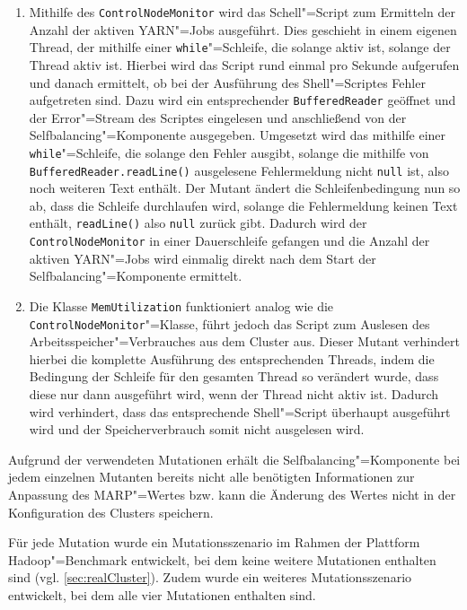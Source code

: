 \begin{enumerate}
    \item
    Mithilfe des \texttt{ControlNodeMonitor} wird das Schell"=Script zum Ermitteln der Anzahl der aktiven \gls{YARN}"=Jobs ausgeführt.
    Dies geschieht in einem eigenen Thread, der mithilfe einer \texttt{while}"=Schleife, die solange aktiv ist, solange der Thread aktiv ist.
    Hierbei wird das Script rund einmal pro Sekunde aufgerufen und danach ermittelt, ob bei der Ausführung des Shell"=Scriptes Fehler aufgetreten sind.
    Dazu wird ein entsprechender \texttt{BufferedReader} geöffnet und der Error"=Stream des Scriptes eingelesen und anschließend von der Selfbalancing"=Komponente ausgegeben.
    Umgesetzt wird das mithilfe einer \texttt{while}"=Schleife, die solange den Fehler ausgibt, solange die mithilfe von \texttt{BufferedReader.readLine()} ausgelesene Fehlermeldung nicht \texttt{null} ist, also noch weiteren Text enthält.
    Der Mutant ändert die Schleifenbedingung nun so ab, dass die Schleife durchlaufen wird, solange die Fehlermeldung keinen Text enthält, \texttt{readLine()} also \texttt{null} zurück gibt.
    Dadurch wird der \texttt{ControlNodeMonitor} in einer Dauerschleife gefangen und die Anzahl der aktiven \gls{YARN}"=Jobs wird einmalig direkt nach dem Start der Selfbalancing"=Komponente ermittelt.
            
    \item
    Die Klasse \texttt{MemUtilization} funktioniert analog wie die \texttt{ControlNodeMonitor}"=Klasse, führt jedoch das Script zum Auslesen des Arbeitsspeicher"=Verbrauches aus dem Cluster aus.
    Dieser Mutant verhindert hierbei die komplette Ausführung des entsprechenden Threads, indem die Bedingung der Schleife für den gesamten Thread so verändert wurde, dass diese nur dann ausgeführt wird, wenn der Thread nicht aktiv ist.
    Dadurch wird verhindert, dass das entsprechende Shell"=Script überhaupt ausgeführt wird und der Speicherverbrauch somit nicht ausgelesen wird.
\end{enumerate}

Aufgrund der verwendeten Mutationen erhält die Selfbalancing"=Komponente bei jedem einzelnen Mutanten bereits nicht alle benötigten Informationen zur Anpassung des \gls{MARP}"=Wertes bzw. kann die Änderung des Wertes nicht in der Konfiguration des Clusters speichern.

Für jede Mutation wurde ein Mutationsszenario im Rahmen der Plattform Hadoop"=Benchmark entwickelt, bei dem keine weitere Mutationen enthalten sind (vgl. \cref{sec:realCluster}).
Zudem wurde ein weiteres Mutationsszenario entwickelt, bei dem alle vier Mutationen enthalten sind.

